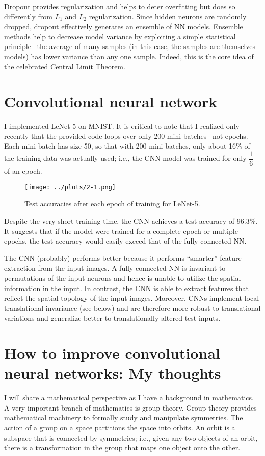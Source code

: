 \documentclass[11pt]{article}
\begin{document}
Dropout provides regularization and helps to deter overfitting but does so differently from $L_1$ and $L_2$ regularization. Since hidden neurons are randomly dropped, dropout effectively generates an ensemble of NN models. Ensemble methods help to decrease model variance by exploiting a simple statistical principle-- the average of many samples (in this case, the samples are themselves models) has lower variance than any one sample. Indeed, this is the core idea of the celebrated Central Limit Theorem.

\section{Convolutional neural network}

I implemented LeNet-5 on MNIST. It is critical to note that I realized only recently that the provided code loops over only 200 mini-batches-- not epochs. Each mini-batch has size 50, so that with 200 mini-batches, only about 16\% of the training data was actually used; i.e., the CNN model was trained for only $\dfrac{1}{6}$ of an epoch.

\begin{figure}
\centering
\texttt{[image: ../plots/2-1.png]}
\caption{\label{fig-2-1} Test accuracies after each epoch of training for LeNet-5.}
\end{figure}

Despite the very short training time, the CNN achieves a test accuracy of 96.3\%. It suggests that if the model were trained for a complete epoch or multiple epochs, the test accuracy would easily exceed that of the fully-connected NN.

The CNN (probably) performs better because it performs ``smarter'' feature extraction from the input images. A fully-connected NN is invariant to permutations of the input neurons and hence is unable to utilize the spatial information in the input. In contrast, the CNN is able to extract features that reflect the spatial topology of the input images. Moreover, CNNs implement local translational invariance (see below) and are therefore more robust to translational variations and generalize better to translationally altered test inputs.

\section{How to improve convolutional neural networks: My thoughts}

I will share a mathematical perspective as I have a background in mathematics. A very important branch of mathematics is group theory. Group theory provides mathematical machinery to formally study and manipulate symmetries. The action of a group on a space partitions the space into orbits. An orbit is a subspace that is connected by symmetries; i.e., given any two objects of an orbit, there is a transformation in the group that maps one object onto the other.
\end{document}
